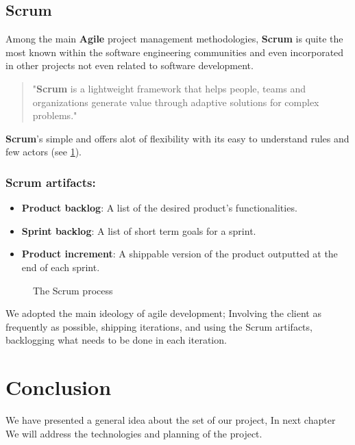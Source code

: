 \subsection{Scrum}
Among the main \textbf{Agile} project management methodologies, \textbf{Scrum} is quite the most known within
the software engineering communities and even incorporated in other projects not even related to software
development.
\begin{quote}
    "\textbf{Scrum} is a lightweight framework that helps people, teams and organizations generate value through adaptive solutions for complex problems." \cite{WhatIsScrum}
\end{quote}
\textbf{Scrum}'s simple and offers alot of flexibility with its easy to understand rules and few actors (see \ref{fig:Scrum_process}).
 
\subsubsection*{Scrum artifacts:}
\begin{itemize}
    \item \textbf{Product backlog}: A list of the desired product's functionalities.
    \item \textbf{Sprint backlog}: A list of short term goals for a sprint.
    \item \textbf{Product increment}: A shippable version of the product outputted at the end of each sprint.
\end{itemize}

\begin{figure}[htpb]
    \centering
    \caption{The Scrum process \cite{ScrumPoster}}
    \label{fig:Scrum_process}
    \end{figure}

We adopted the main ideology of agile development; Involving the client as frequently as possible, shipping iterations,
and using the Scrum artifacts, backlogging what needs to be done in each iteration.

    
    
    

\section*{Conclusion}
We have presented a general idea about the set of our project, In next chapter We will address the 
technologies and planning of the project.